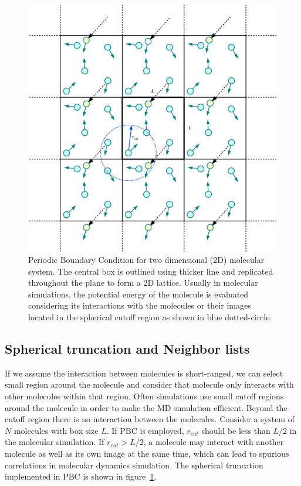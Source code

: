  
\begin{figure}[tpb]
  \begin{center}
    \centerline{\includegraphics[width = \linewidth]{PBC.pdf}}
    \caption{Periodic Boundary Condition for two dimensional (2D) molecular system. The central 	box is outlined using thicker line and replicated throughout the plane to form a 2D lattice. Usually in molecular simulations, the potential energy of the molecule is evaluated considering its interactions with the molecules or their images located in the spherical cutoff region as shown in blue dotted-circle.}
    \label{fig:PBC}
  \end{center}
\end{figure}

\subsection{Spherical truncation and Neighbor lists }
If we assume the interaction between molecules is short-ranged, we can select small region around the molecule and consider that molecule only interacts with other molecules within that region. Often simulations use small cutoff regions around the molecule in order to make the MD simulation efficient. Beyond the cutoff region there is no interaction between the molecules. Consider a system of $N$  molecules with box size $L$. If PBC is employed, $r_{cut}$ should be less than $L/2$ in the molecular  simulation. If $r_{cut} > L/2$, a molecule may interact with another molecule as well as its own image at the same time, which can lead to spurious correlations in molecular dynamics simulation. The spherical truncation implemented in PBC is shown in figure~\ref{fig:PBC}. 

